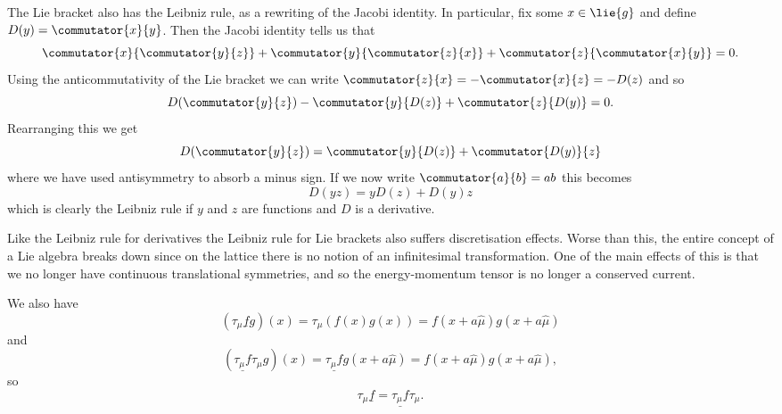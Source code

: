 \documentclass[fleqn]{NotesClass}
\newcommand{\multiplicative}[1]{\underline{#1}}
\begin{document}
    The Lie bracket also has the Leibniz rule, as a rewriting of the Jacobi identity.
    In particular, fix some \(x \in \lie{g}\) and define \(D(y) = \commutator{x}{y}\).
    Then the Jacobi identity tells us that
    \begin{equation}
        \commutator{x}{\commutator{y}{z}} + \commutator{y}{\commutator{z}{x}} + \commutator{z}{\commutator{x}{y}} = 0.
    \end{equation}
    Using the anticommutativity of the Lie bracket we can write \(\commutator{z}{x} = -\commutator{x}{z} = -D(z)\) and so
    \begin{equation}
        D(\commutator{y}{z}) - \commutator{y}{D(z)} + \commutator{z}{D(y)} = 0.
    \end{equation}
    Rearranging this we get
    \begin{equation}
        D(\commutator{y}{z}) = \commutator{y}{D(z)} + \commutator{D(y)}{z}
    \end{equation}
    where we have used antisymmetry to absorb a minus sign.
    If we now write \(\commutator{a}{b} = ab\) this becomes
    \begin{equation}
        D(yz) = yD(z) + D(y)z
    \end{equation}
    which is clearly the Leibniz rule if \(y\) and \(z\) are functions and \(D\) is a derivative.
    
    Like the Leibniz rule for derivatives the Leibniz rule for Lie brackets also suffers discretisation effects.
    Worse than this, the entire concept of a Lie algebra breaks down since on the lattice there is no notion of an infinitesimal transformation.
    One of the main effects of this is that we no longer have continuous translational symmetries, and so the energy-momentum tensor is no longer a conserved current.
    
    We also have
    \begin{equation}
        (\tau_\mu \multiplicative{f}g)(x) = \tau_\mu(f(x)g(x)) = f(x + a\hat{\mu})g(x + a\hat{\mu})
    \end{equation}
    and
    \begin{equation}
        (\multiplicative{\tau_\mu f}\tau_\mu g)(x) = \multiplicative{\tau_\mu f}g(x + a\hat{\mu}) = f(x + a\hat{\mu})g(x + a\hat{\mu}),
    \end{equation}
    so
    \begin{equation}
        \tau_\mu\multiplicative{f} = \multiplicative{\tau_\mu f}\tau_\mu.
    \end{equation}
    
\end{document}
